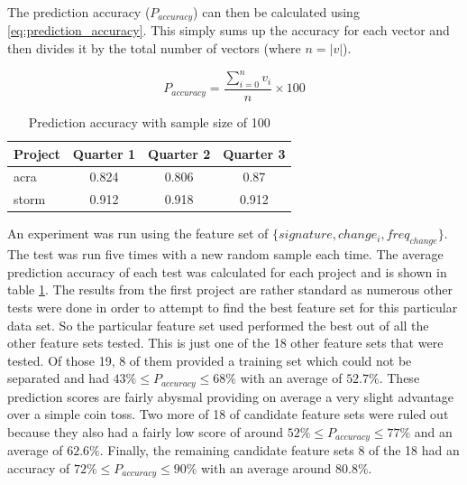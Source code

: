 The prediction accuracy ($P_{accuracy}$) can then be calculated using \ref{eq:prediction_accuracy}. This simply sums up the accuracy for each vector and then divides it by the total number of vectors (where $n = |v|$).

\begin{equation}
\label{eq:prediction_accuracy}
P_{accuracy} = \frac{\sum_{i=0}^{n}v_i}{n} \times 100
\end{equation}

\begin{table}
\begin{center}

    \begin{tabular}{|l|c|c|c|}
        \hline
        Project & Quarter 1 & Quarter 2 & Quarter 3 \\ \hline
        acra & 0.824 & 0.806 & 0.87   \\ \hline
        storm & 0.912 & 0.918 & 0.912 \\ \hline
    \end{tabular}
    \caption{Prediction accuracy with sample size of 100}
    \label{tab:test_signature_change_freq_100}
\end{center}

\end{table}

An experiment was run using the feature set of $\{signature, change_i, freq_{change}\}$. The test was run five times with a new random sample each time. The average prediction accuracy of each test was calculated for each project and is shown in table \ref{tab:test_signature_change_freq_100}. The results from the first project are rather standard as numerous other tests were done in order to attempt to find the best feature set for this particular data set. So the particular feature set used performed the best out of all the other feature sets tested. This is just one of the 18 other feature sets that were tested. Of those 19, 8 of them provided a training set which could not be separated and had $43\% \leq P_{accuracy} \leq 68\%$ with an average of $52.7\%$. These prediction scores are fairly abysmal providing on average a very slight advantage over a simple coin toss. Two more of 18 of candidate feature sets were ruled out because they also had a fairly low score of around $52\% \leq P_{accuracy} \leq 77\%$ and an average of $62.6\%$. Finally, the remaining candidate feature sets 8 of the 18 had an accuracy of $72\% \leq P_{accuracy} \leq 90\%$ with an average around $80.8\%$. 

